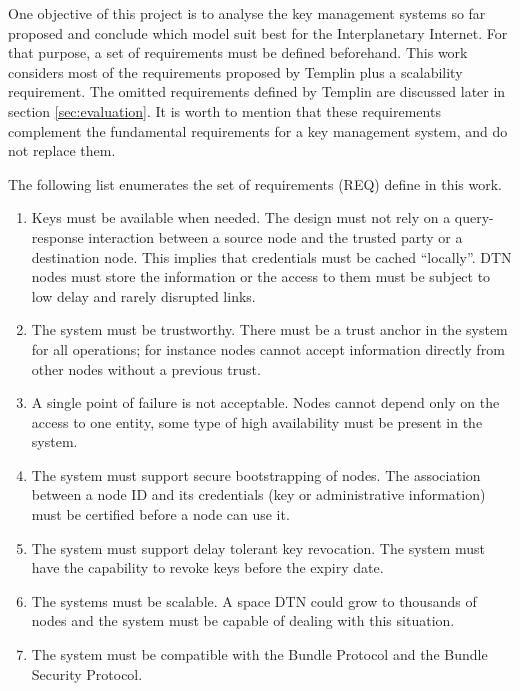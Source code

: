 

One objective of this project is to analyse the key management systems so far proposed and conclude which model suit best for the Interplanetary Internet. For that purpose, a set of requirements must be defined beforehand. This work considers most of the requirements proposed by Templin  \cite{templin-dtnskmreq-00} plus a scalability requirement. The omitted requirements defined by Templin are discussed later in section \ref{sec:evaluation}. It is worth to mention that these requirements complement the fundamental requirements for a key management system, and do not replace them. 

The following list enumerates the set of requirements (REQ) define in this work.

\begin{enumerate}
    \item Keys must be available when needed. The design must not rely on a query-response interaction between a source node and the trusted party or a destination node. This implies that credentials must be cached ``locally''. DTN nodes must store the information or the access to them must be subject to low delay and rarely disrupted links.
    \item The system must be trustworthy. There must be a trust anchor in the system for all operations; for instance nodes cannot accept information directly from other nodes without a previous trust.
    \item A single point of failure is not acceptable. Nodes cannot depend only on the access to one entity,  some type of high availability must be present in the system.
    \item The system must support secure bootstrapping of nodes. The association between a node ID and its credentials (key or administrative information) must be certified before a node can use it.
    \item The system must support delay tolerant key revocation. The system must have the capability to revoke keys before the expiry date. 
    \item The systems must be scalable. A space DTN could grow to thousands of nodes and the system must be capable of dealing with this situation. 
    \item The system must be compatible with the Bundle Protocol and the Bundle Security Protocol.
\end{enumerate}

